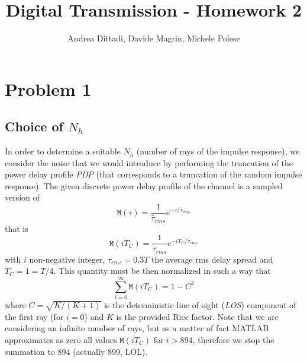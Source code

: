 \documentclass[10pt]{article}
\newcommand{\M} {\mathtt{M}}
\begin{document}
\title{Digital Transmission - Homework 2}
\author{Andrea Dittadi, Davide Magrin, Michele Polese}

\maketitle

\section*{Problem 1}

\subsection*{Choice of $N_h$}

In order to determine a suitable $N_h$ (number of rays of the impulse response), we consider the noise that we would introduce by performing the truncation of the power delay profile \textit{PDP} (that corresponds to a truncation of the random impulse response). The given discrete power delay profile of the channel is a sampled version of
\begin{equation}
\M(\tau) = \frac{1}{\bar{\tau}_{rms}} e^{-\tau / \bar{\tau}_{rms}}
\end{equation}
that is
\begin{equation}
\M(iT_C) = \frac{1}{\bar{\tau}_{rms}} e^{-iT_C / \bar{\tau}_{rms}}
\end{equation}
with $i$ non-negative integer, $\tau_{rms} = 0.3T$ the average rms delay spread and $T_C = 1 = T/4$. This quantity must be then normalized in such a way that
\begin{equation}
\sum_{i=0}^{\infty} \M(iT_C) = 1 - C^2
\end{equation}
where $C = \sqrt{K / (K+1)}$ is the deterministic line of sight (\textit{LOS}) component of the first ray (for $i=0$) and $K$ is the provided Rice factor. Note that we are considering an infinite number of rays, but as a matter of fact MATLAB approximates as zero all values $\M(iT_C)$ for $i > 894$, therefore we stop the summation to 894 (actually 899, LOL). %
\end{document}
